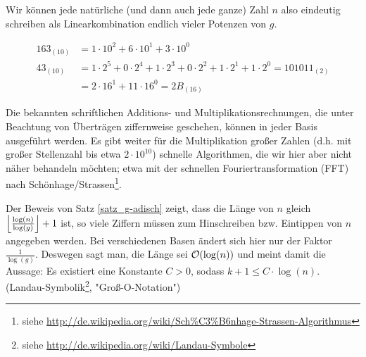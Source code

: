 \begin{bem}
	Wir können jede natürliche (und dann auch jede ganze) Zahl $n$ also eindeutig schreiben als Linearkombination endlich vieler Potenzen von $g$.
\end{bem}

\begin{bsp}
 \begin{equation}
 \begin{aligned}
	 163_{(10)} &= 1 \cdot 10^2 + 6 \cdot 10^1 + 3 \cdot 10^0 \\
	 43_{(10)}	&= 1 \cdot 2^5 + 0 \cdot 2^4 + 1 \cdot 2^3 + 0 \cdot 2^2 + 1 \cdot 2^1 + 1 \cdot 2^0 = 101011_{(2)} \\
	 &= 2 \cdot 16^1 + 11 \cdot 16^0 = 2B_{(16)}
 \end{aligned}
 \end{equation}
\end{bsp}

Die bekannten schriftlichen Additions- und Multiplikationsrechnungen, die unter Beachtung von Überträgen ziffernweise geschehen, können in jeder Basis ausgeführt werden. Es gibt weiter für die Multiplikation großer Zahlen (d.h. mit großer Stellenzahl bis etwa $2 \cdot 10^{10}$) schnelle Algorithmen, die wir hier aber nicht näher behandeln möchten; etwa mit der schnellen Fouriertransformation (FFT) nach Schönhage/Strassen\footnote{siehe \url{http://de.wikipedia.org/wiki/Sch\%C3\%B6nhage-Strassen-Algorithmus}}.

Der Beweis von Satz \ref{satz_g-adisch} zeigt, dass die Länge von $n$ gleich $\floor*{\frac{\log(n)}{\log(g)}}+1$ ist, so viele Ziffern müssen zum Hinschreiben bzw. Eintippen von $n$ angegeben werden. Bei verschiedenen Basen ändert sich hier nur der Faktor $\frac{1}{\log(g)}$. Deswegen sagt man, die Länge sei $\oh(\log(n))$ und meint damit die Aussage: Es existiert eine Konstante $C > 0$, sodass $k + 1 \leq C \cdot \log(n)$. (Landau-Symbolik\footnote{siehe \url{http://de.wikipedia.org/wiki/Landau-Symbole}}, "Groß-O-Notation")

\newpage